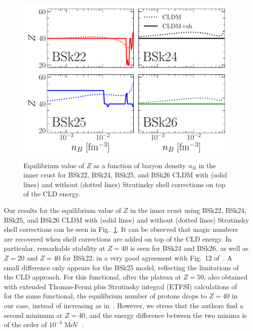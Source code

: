 \begin{figure}[!t]
\begin{center}
  \includegraphics[width=0.9\linewidth]{figures/icrust_compo_bsk.pdf}
\end{center}
\caption[Equilibrium value of $Z$ versus baryon density in the inner crust
with Strutinsky shell corrections]{Equilibrium value of $Z$ as a function of baryon 
  density $n_B$ in the inner crust for BSk22, BSk24, BSk25, and BSk26 CLDM 
  with (solid lines) and without (dotted lines) Strutinsky shell corrections 
  on top of the CLD energy.}\label{fig:icrust_compo_bsk}
\end{figure}

Our results for the equilibrium value of $Z$ in the inner crust using BSk22, 
BSk24, BSk25, and BSk26 CLDM with (solid lines) and without (dotted lines)
Strutinsky shell corrections can be seen in Fig.~\ref{fig:icrust_compo_bsk}.
It can be observed that magic numbers are recovered when shell corrections are
added on top of the CLD energy. In particular, remarkable stability at $Z=40$
is seen for BSk24 and BSk26, as well as $Z=20$ and $Z=40$ for BSk22, in a very 
good agreement with Fig.~12 of~\cite{Pearson2018}. A small difference only
appears for the BSk25 model, reflecting the limitations of the CLD approach.
For this functional, after the plateau at $Z=50$, also obtained with extended
Thomas-Fermi plus Strutinsky integral (ETFSI) calculations
of~\cite{Pearson2018} for the same functional, the equilibrium number of
protons drops to $Z=40$ in our case, instead of increasing as
in~\cite{Pearson2018}. However, we stress that the authors find a second 
minimum at $Z=40$, and the energy difference between the two minima is of 
the order of $10^{-3}$ MeV~\cite{Pearson2019}.

